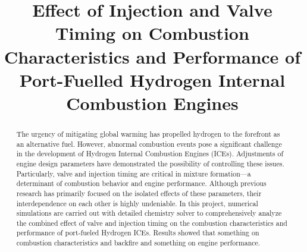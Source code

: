 \documentclass[conference]{IEEEtran}
\begin{document}
\title{Effect of Injection and Valve Timing on Combustion Characteristics and Performance of Port-Fuelled Hydrogen Internal Combustion Engines
}

\author{
\and
{}
\and
{}
\and
{}
\and
{}
}

\maketitle

\begin{abstract}
    The urgency of mitigating global warming has propelled hydrogen to the forefront as an alternative fuel. However, abnormal combustion events pose a significant challenge in the development of Hydrogen Internal Combustion Engines (ICEs). Adjustments of engine design parameters have demonstrated the possibility of controlling these issues. Particularly, valve and injection timing are critical in mixture formation—a determinant of combustion behavior and engine performance. Although previous research has primarily focused on the isolated effects of these parameters, their interdependence on each other is highly undeniable. In this project, numerical simulations are carried out with detailed chemistry solver to comprehensively analyze the combined effect of valve and injection timing on the combustion characteristics and performance of port-fueled Hydrogen ICEs. Results showed that something on combustion characteristics and backfire and something on engine performance.


\end{abstract}
\end{document}
